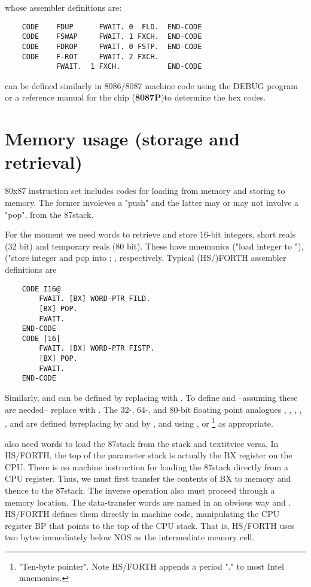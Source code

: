 whose assembler definitions are:
\begin{lstlisting}
    CODE    FDUP      FWAIT. 0  FLD.  END-CODE
    CODE    FSWAP     FWAIT. 1 FXCH.  END-CODE
    CODE    FDROP     FWAIT. 0 FSTP.  END-CODE
    CODE    F-ROT     FWAIT. 2 FXCH.
            FWAIT.  1 FXCH.           END-CODE
\end{lstlisting}

can be defined similarly in 8086/8087 machine code using the
DEBUG program or a reference manual for the chip (\eg \textbf{8087P})to determine the hex codes.

\section{Memory usage (storage and retrieval)}

 80x87 instruction set includes codes for loading  from memory and storing  to memory. The former involeves a "push" and the latter may or may not involve a "pop", from
the 87stack.

For the moment we need words to retrieve and store 16-bit integers, short reals (32 bit) and temporary reals (80 bit). These have mnemonics  ("load integer to "), ("store integer and pop  into ; ,  respectively. Typical (HS/)FORTH assembler definitions are

\begin{lstlisting}
    CODE I16@
        FWAIT. [BX] WORD-PTR FILD.
        [BX] POP.
        FWAIT.
    END-CODE
    CODE |16|
        FWAIT. [BX] WORD-PTR FISTP.
        [BX] POP.
        FWAIT.
    END-CODE
\end{lstlisting}

Similarly,  and  can be defined by replacing  with . To define  and  --assuming these are needed-- replace  with . The 32-, 64-, and 80-bit floating point analogues , , , , , and  are defined byreplacing  by  and  by , and using ,  or \footnote{"Ten-byte pointer". Note HS/FORTH appends a period "." to most Intel mnemonics.} as appropriate.

 also need words to load the 87stack from the stack and textit{vice versa}. In HS/FORTH, the top of the parameter stack is actually the BX register on the CPU. There is no machine instruction for loading the 87stack directly from a CPU register. Thus, we must first transfer the contents of BX to memory and thence to the 87stack. The inverse operation also must proceed through a memory location. The data-transfer words are named in an obvious way  and . HS/FORTH defines them directly in machine code, manipulating the CPU register BP that points to the top of the CPU stack. That is, HS/FORTH uses two bytes immediately below NOS as the intermediate memory cell.

